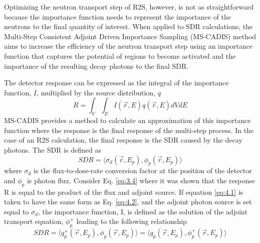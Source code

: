 Optimizing the neutron transport step of R2S, however, is not as
straightforward
because the importance function needs to represent the importance of the neutrons to the
final quantity of interest\cite{Ibrahim_2015}.
When applied to SDR calculations, the Multi-Step Consistent Adjoint Driven Importance Sampling (MS-CADIS) method
aims to increase the efficiency of the neutron transport step using an importance function
that captures the potential of regions to become activated and the importance of
the resulting decay photons to the final SDR\cite{Ibrahim_2015}.

The detector response can be
expressed as the integral of the importance function, $I$, multiplied by the source
distribution, $q$
\begin{equation} \label{eq:4.1}
R = \int_{V}\int_{E} 
    I(\overrightarrow{r}, E)
    q(\overrightarrow{r}, E)
    dV dE
\end{equation}
MS-CADIS provides a method to calculate an approximation of this importance function
where the response is the final response of the multi-step process.  In the case
of an R2S calculation, the final response is the SDR caused by the decay
photons.  The SDR is defined as 
\begin{equation} \label{eq:4.2}
  SDR =  \langle \sigma_{d}(\overrightarrow{r},E_{p}),
  \phi_{p}(\overrightarrow{r}, E_{p}) \rangle
\end{equation}
where $\sigma_{d}$ is the flux-to-dose-rate conversion factor at the position of
the detector and $\phi_{p}$ is photon flux.
Consider Eq. \ref{eq:3.4} where it was shown that the response R is
equal to the product of the flux and adjoint source.  
If equation \ref{eq:4.1}
is taken to have the same form as Eq. \ref{eq:4.2}, and the adjoint photon
source is set equal to $\sigma_d$, the importance function, I,
is defined as the solution of the adjoint transport equation, $\phi_{p}^{+}$
leading to the following relationship
\begin{equation} \label{eq:4.3}
	SDR =  \langle q_{p}^{+}(\overrightarrow{r},E_{p}),
  \phi_{p}(\overrightarrow{r}, E_{p}) \rangle 
	= \langle q_{p}(\overrightarrow{r},E_{p}),
  \phi_{p}^{+}(\overrightarrow{r}, E_{p}) \rangle 
\end{equation}
